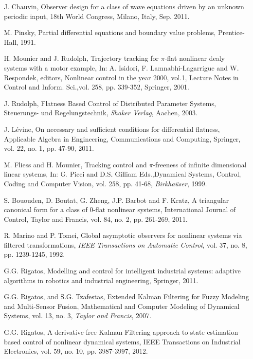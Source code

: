 \documentclass[journal]{IEEEtran}
\begin{document}
\begin{thebibliography}{100}
 \label{Chau11}
J. Chauvin, Observer design for a class of wave equations driven by an unknown periodic input, 18th World Congress, Milano, Italy, Sep. 2011.

 \label{Pin91}
M. Pinsky, Partial differential equations and boundary value problems, Prentice-Hall, 1991.


 \label{MouRud01}
H. Mounier and J. Rudolph, Trajectory tracking for $\pi$-flat nonlinear dealy systems with a motor example, In: A.
Isidori, F. Lamnabhi-Lagarrigue and W. Respondek, editors, Nonlinear control in the year 2000, vol.1, Lecture
Notes in Control and Inform. Sci.,vol. 258, pp. 339-352, Springer, 2001.


 \label{Rud03}
J. Rudolph, Flatness Based Control of Distributed Parameter Systems, Steuerungs- und Regelungstechnik,
\textit{Shaker Verlag}, Aachen, 2003.

 \label{Lev10}
J. L\'{e}vine, On necessary and sufficient conditions for differential flatness, Applicable Algebra in Engineering, Communications and Computing,  Springer, vol. 22, no. 1, pp. 47-90, 2011.

 \label{FliMou99}
M. Fliess and H. Mounier, Tracking control and $\pi$-freeness of infinite dimensional linear systems, In: G. Picci and D.S. Gilliam Eds.,Dynamical Systems, Control, Coding and Computer Vision, vol. 258, pp. 41-68, \textit{Birkha\"{u}ser}, 1999.

 \label{BouBouZheBarKra11}
S. Bououden, D. Boutat, G. Zheng, J.P. Barbot and F. Kratz, A triangular canonical form for a class of 0-flat nonlinear systems, International Journal of Control, Taylor and Francis, vol. 84, no. 2, pp. 261-269, 2011.

 \label{MarTom92}
R. Marino and P. Tomei, Global asymptotic observers for nonlinear systems via filtered transformations, \textit{IEEE Transactions on Automatic Control}, vol. 37, no. 8, pp. 1239-1245, 1992.

 \label{Rig11}
G.G. Rigatos, Modelling and control for intelligent industrial systems: adaptive algorithms in robotics and industrial engineering, Springer, 2011.

 \label{RigTza07}
G.G. Rigatos, and S.G. Tzafestas, Extended Kalman Filtering for Fuzzy Modeling and Multi-Sensor Fusion, Mathematical and Computer Modeling of Dynamical Systems, vol. 13, no. 3, \textit{Taylor and Francis}, 2007.

 \label{Rig12a}
G.G. Rigatos, A derivative-free Kalman Filtering approach to state estimation-based control of nonlinear dynamical systems, IEEE Transactions on Industrial Electronics, vol. 59, no. 10, pp. 3987-3997, 2012.


\end{thebibliography}
\end{document}
